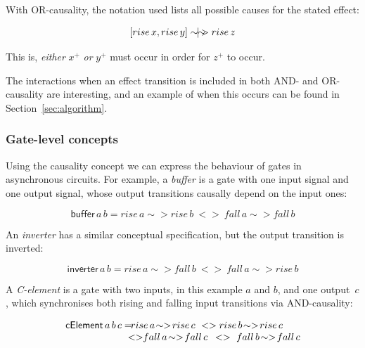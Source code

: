 \documentclass[british,conference,compsoc]{IEEEtran}
\begin{document}
With OR-causality, the notation used lists all possible causes for the stated 
effect:

\vspace{-2mm}

\[
[rise\,x, rise\,y]\sim\hspace{-1.5mm}|\hspace{-1.5mm}\sim\hspace{-1.5mm}>rise\,z
\]

\vspace{-1mm}

This is, \emph{either} $x^{+}$ \emph{or} $y^{+}$ must occur in order for 
$z^{+}$ to occur.

The interactions when an effect transition is included in both AND- and 
OR-causality are interesting, and an example of when this occurs can be found 
in Section~\ref{sec:algorithm}.

\vspace{-2mm}

\subsubsection{Gate-level concepts} Using the causality concept we can express
the behaviour of gates in asynchronous circuits. For example, a \emph{buffer}
is a gate with one input signal and one output signal,
whose output transitions causally depend on the input ones:

\vspace{-4mm}

\[
\mathsf{buffer}\,a\,b=rise\,a \sim> rise\,b\ <>\
fall\,a\sim> fall\,b
\]

\vspace{-1mm}

\noindent An \emph{inverter} has a similar conceptual specification, but the
output transition is inverted:

\vspace{-4mm}

\[
\mathsf{inverter}\,a\,b=rise\,a\sim> fall\,b\ <>\
fall\,a\sim> rise\,b
\]

\vspace{-1mm}

\noindent A \emph{C-element} is a gate with two inputs, in this example $a$ and $b$, and one
output~$c$, which synchronises both rising and falling input transitions
via AND-causality:

\vspace{-3mm}

\[
\begin{array}{lcl}
\mathsf{cElement}\,a\, b\, c=&\hspace{-9mm}rise\,a\!\sim>\! 
	rise\,c\ <> rise\,b\!\sim>\! rise\,c\ \\
&\hspace{-5mm}<>\hspace{-1mm} fall\,a\!\sim>\! fall\,c\ \,
	<>\ fall\,b\!\sim>\! fall\,c
\end{array}
\]
\end{document}
